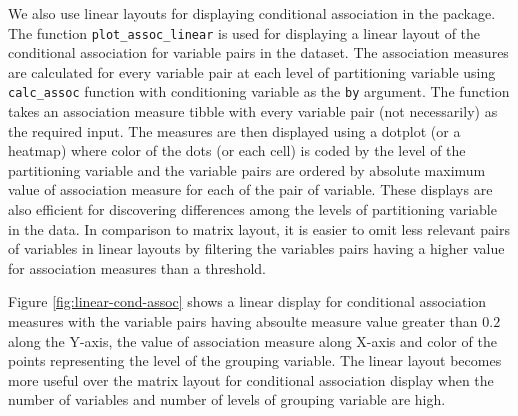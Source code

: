 \begin{Schunk}
\begin{figure}
\end{figure}
\end{Schunk}

We also use linear layouts for displaying conditional association in the
package. The function \texttt{plot\_assoc\_linear} is used for
displaying a linear layout of the conditional association for variable
pairs in the dataset. The association measures are calculated for every
variable pair at each level of partitioning variable using
\texttt{calc\_assoc} function with conditioning variable as the
\texttt{by} argument. The function takes an association measure tibble
with every variable pair (not necessarily) as the required input. The
measures are then displayed using a dotplot (or a heatmap) where color
of the dots (or each cell) is coded by the level of the partitioning
variable and the variable pairs are ordered by absolute maximum value of
association measure for each of the pair of variable. These displays are
also efficient for discovering differences among the levels of
partitioning variable in the data. In comparison to matrix layout, it is
easier to omit less relevant pairs of variables in linear layouts by
filtering the variables pairs having a higher value for association
measures than a threshold.

Figure \ref{fig:linear-cond-assoc} shows a linear display for
conditional association measures with the variable pairs having absoulte
measure value greater than \(0.2\) along the Y-axis, the value of
association measure along X-axis and color of the points representing
the level of the grouping variable. The linear layout becomes more
useful over the matrix layout for conditional association display when
the number of variables and number of levels of grouping variable are
high.

